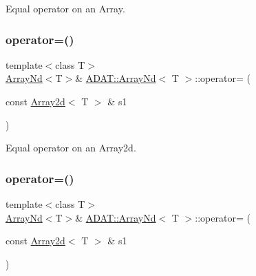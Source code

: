 Equal operator on an Array. 

\mbox{\label{classADAT_1_1ArrayNd_a95293530c9643394ae8133f0203d342b}} 
\subsubsection{\texorpdfstring{operator=()}{operator=()}\hspace{0.1cm}{\footnotesize\ttfamily [5/10]}}
{\footnotesize\ttfamily template$<$class T$>$ \\
\mbox{\hyperlink{classADAT_1_1ArrayNd}{Array\+Nd}}$<$T$>$\& \mbox{\hyperlink{classADAT_1_1ArrayNd}{A\+D\+A\+T\+::\+Array\+Nd}}$<$ T $>$\+::operator= (\begin{DoxyParamCaption}\item[{const \mbox{\hyperlink{classXMLArray_1_1Array2d}{Array2d}}$<$ T $>$ \&}]{s1 }\end{DoxyParamCaption})\hspace{0.3cm}{\ttfamily [inline]}}



Equal operator on an Array2d. 

\mbox{\label{classADAT_1_1ArrayNd_a95293530c9643394ae8133f0203d342b}} 
\subsubsection{\texorpdfstring{operator=()}{operator=()}\hspace{0.1cm}{\footnotesize\ttfamily [6/10]}}
{\footnotesize\ttfamily template$<$class T$>$ \\
\mbox{\hyperlink{classADAT_1_1ArrayNd}{Array\+Nd}}$<$T$>$\& \mbox{\hyperlink{classADAT_1_1ArrayNd}{A\+D\+A\+T\+::\+Array\+Nd}}$<$ T $>$\+::operator= (\begin{DoxyParamCaption}\item[{const \mbox{\hyperlink{classXMLArray_1_1Array2d}{Array2d}}$<$ T $>$ \&}]{s1 }\end{DoxyParamCaption})\hspace{0.3cm}{\ttfamily [inline]}}



